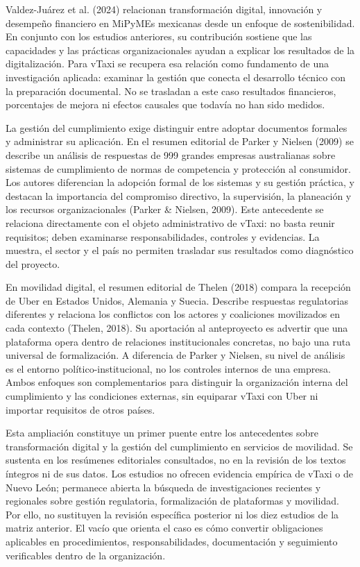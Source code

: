 {Valdez-Juárez et al. (2024) relacionan transformación digital, innovación y desempeño financiero en MiPyMEs mexicanas desde un enfoque de sostenibilidad. En conjunto con los estudios anteriores, su contribución sostiene que las capacidades y las prácticas organizacionales ayudan a explicar los resultados de la digitalización. Para vTaxi se recupera esa relación como fundamento de una investigación aplicada: examinar la gestión que conecta el desarrollo técnico con la preparación documental. No se trasladan a este caso resultados financieros, porcentajes de mejora ni efectos causales que todavía no han sido medidos.


La gestión del cumplimiento exige distinguir entre adoptar documentos formales y administrar su aplicación. En el resumen editorial de Parker y Nielsen (2009) se describe un análisis de respuestas de 999 grandes empresas australianas sobre sistemas de cumplimiento de normas de competencia y protección al consumidor. Los autores diferencian la adopción formal de los sistemas y su gestión práctica, y destacan la importancia del compromiso directivo, la supervisión, la planeación y los recursos organizacionales (Parker \& Nielsen, 2009). Este antecedente se relaciona directamente con el objeto administrativo de vTaxi: no basta reunir requisitos; deben examinarse responsabilidades, controles y evidencias. La muestra, el sector y el país no permiten trasladar sus resultados como diagnóstico del proyecto.


En movilidad digital, el resumen editorial de Thelen (2018) compara la recepción de Uber en Estados Unidos, Alemania y Suecia. Describe respuestas regulatorias diferentes y relaciona los conflictos con los actores y coaliciones movilizados en cada contexto (Thelen, 2018). Su aportación al anteproyecto es advertir que una plataforma opera dentro de relaciones institucionales concretas, no bajo una ruta universal de formalización. A diferencia de Parker y Nielsen, su nivel de análisis es el entorno político-institucional, no los controles internos de una empresa. Ambos enfoques son complementarios para distinguir la organización interna del cumplimiento y las condiciones externas, sin equiparar vTaxi con Uber ni importar requisitos de otros países.


Esta ampliación constituye un primer puente entre los antecedentes sobre transformación digital y la gestión del cumplimiento en servicios de movilidad. Se sustenta en los resúmenes editoriales consultados, no en la revisión de los textos íntegros ni de sus datos. Los estudios no ofrecen evidencia empírica de vTaxi o de Nuevo León; permanece abierta la búsqueda de investigaciones recientes y regionales sobre gestión regulatoria, formalización de plataformas y movilidad. Por ello, no sustituyen la revisión específica posterior ni los diez estudios de la matriz anterior. El vacío que orienta el caso es cómo convertir obligaciones aplicables en procedimientos, responsabilidades, documentación y seguimiento verificables dentro de la organización.


}
